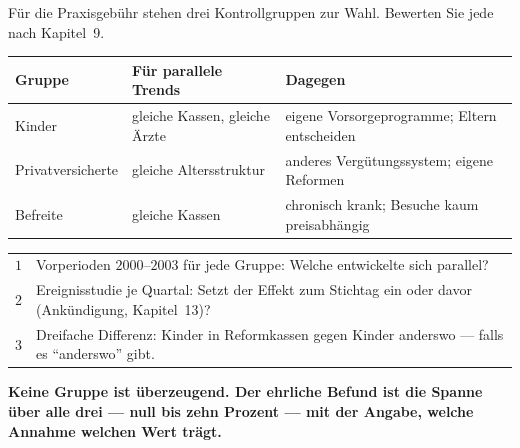 \begin{aufgabe}
Für die Praxisgebühr stehen drei Kontrollgruppen zur Wahl. Bewerten Sie jede nach Kapitel~9.

\loesung
{}
\begin{center}
{\small
\renewcommand{\arraystretch}{1.5}
\begin{tabular}{@{}P{2.6cm}P{3.0cm}P{2.8cm}@{}}
\toprule
\textbf{Gruppe} & \textbf{Für parallele Trends} & \textbf{Dagegen}\\
\midrule
Kinder & gleiche Kassen, gleiche Ärzte & eigene Vorsorgeprogramme; Eltern entscheiden\\
Privat\-versicherte & gleiche Altersstruktur & anderes Vergütungssystem; eigene Reformen\\
Befreite & gleiche Kassen & chronisch krank; Besuche kaum preisabhängig\\
\bottomrule
\end{tabular}}
\end{center}

\begin{center}
{\small
\renewcommand{\arraystretch}{1.5}
\begin{tabular}{@{}P{1.0cm}P{7.4cm}@{}}
\toprule
$1$ & Vorperioden $2000$--$2003$ für jede Gruppe: Welche entwickelte sich parallel?\\
$2$ & Ereignisstudie je Quartal: Setzt der Effekt zum Stichtag ein oder davor (Ankündigung, Kapitel~13)?\\
$3$ & Dreifache Differenz: Kinder in Reformkassen gegen Kinder anderswo --- falls es \enquote{anderswo} gibt.\\
\bottomrule
\end{tabular}}
\end{center}

\begin{center}
\begin{minipage}{0.9\textwidth}
\textbf{Keine Gruppe ist überzeugend. Der ehrliche Befund ist die Spanne über alle drei --- null bis zehn Prozent --- mit der Angabe, welche Annahme welchen Wert trägt.}
\end{minipage}
\end{center}

\begin{center}
\begin{minipage}{0.88\textwidth}
\end{minipage}
\end{center}
\end{aufgabe}

